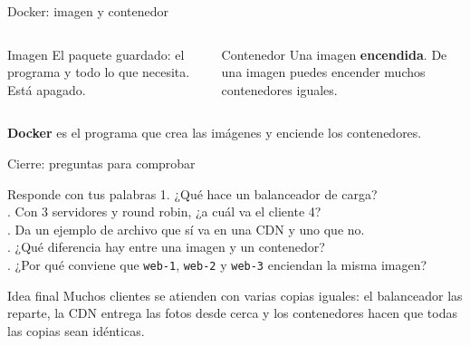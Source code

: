 \documentclass[aspectratio=169,10pt,c]{beamer}
\begin{document}
\begin{frame}{Docker: imagen y contenedor}
\begin{center}
\end{center}
\vspace{3mm}
\begin{columns}[T,onlytextwidth]
\begin{block}{Imagen}
\small El paquete guardado: el programa y todo lo que necesita. Está apagado.
\end{block}
\begin{block}{Contenedor}
\small Una imagen \textbf{encendida}. De una imagen puedes encender muchos contenedores iguales.
\end{block}
\end{columns}
\par\vspace{3mm}
\raggedright\small \textbf{Docker} es el programa que crea las imágenes y enciende los contenedores.
\end{frame}

\begin{frame}{Cierre: preguntas para comprobar}
\begin{block}{Responde con tus palabras}
\small
1. ¿Qué hace un balanceador de carga?\\. Con 3 servidores y round robin, ¿a cuál va el cliente 4?\\. Da un ejemplo de archivo que sí va en una CDN y uno que no.\\. ¿Qué diferencia hay entre una imagen y un contenedor?\\. ¿Por qué conviene que \texttt{web-1}, \texttt{web-2} y \texttt{web-3} enciendan la misma imagen?
\end{block}
\begin{alertblock}{Idea final}
\small Muchos clientes se atienden con varias copias iguales: el balanceador las reparte, la CDN entrega las fotos desde cerca y los contenedores hacen que todas las copias sean idénticas.
\end{alertblock}
\end{frame}
\end{document}
